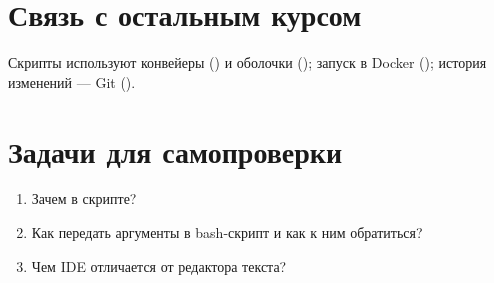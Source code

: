 \section{Связь с остальным курсом}

Скрипты используют конвейеры
() и оболочки
(); запуск в Docker
(); история изменений ---
Git ().

\section{Задачи для самопроверки}
\begin{enumerate}
  \item Зачем  в скрипте?
  \item Как передать аргументы в bash-скрипт и
    как к ним обратиться?
  \item Чем IDE отличается от редактора текста?
\end{enumerate}
